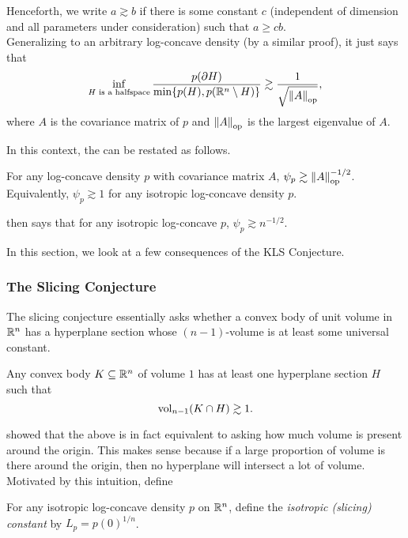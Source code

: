 Henceforth, we write $a\gtrsim b$ if there is some constant $c$ (independent of dimension and all parameters under consideration) such that $a \geq c b$.\\
Generalizing  to an arbitrary log-concave density (by a similar proof), it just says that
\[ \inf_{H\text{ is a halfspace}} \frac{p(\partial H)}{\min\{p(H),p(\mathbb{R}^n\setminus H)\}} \gtrsim \frac{1}{\sqrt{\left\lVert A\right\rVert_{\text{op}}}}, \]
where $A$ is the covariance matrix of $p$ and $\left\lVert A\right\rVert_{\text{op}}$ is the largest eigenvalue of $A$.

In this context, the  can be restated as follows. 

\begin{fcon}
	\label{con: kls conjecture reformulated}
	For any log-concave density $p$ with covariance matrix $A$, $\psi_p \gtrsim \left\lVert A\right\rVert_{\text{op}}^{-1/2}$. Equivalently, $\psi_p\gtrsim 1$ for any isotropic log-concave density $p$.
\end{fcon}

 then says that for any isotropic log-concave $p$, $\psi_p \gtrsim n^{-1/2}$.

In this section, we look at a few consequences of the KLS Conjecture.

\subsubsection{The Slicing Conjecture}

The slicing conjecture essentially asks whether a convex body of unit volume in $\mathbb{R}^n$ has a hyperplane section whose $(n-1)$-volume is at least some universal constant.

\begin{fcon}
	Any convex body $K\subseteq\mathbb{R}^n$ of volume $1$ has at least one hyperplane section $H$ such that
	\[ \operatorname{vol}_{n-1}(K \cap H) \gtrsim 1. \]
\end{fcon}

\cite{slicing-conjecture-equivalent} showed that the above is in fact equivalent to asking how much volume is present around the origin. This makes sense because if a large proportion of volume is there around the origin, then no hyperplane will intersect a lot of volume.\\
Motivated by this intuition, define

\begin{definition}
	For any isotropic log-concave density $p$ on $\mathbb{R}^n$, define the \textit{isotropic (slicing) constant} by $L_p = p(0)^{1/n}$.
\end{definition}

